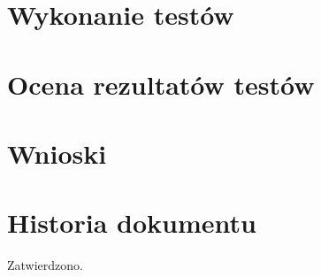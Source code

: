 \documentclass[10pt]{dokument-tiwo}
\begin{document}
\section{Wykonanie testów}


\section{Ocena rezultatów testów}


\section{Wnioski}


\newpage
\section*{Historia dokumentu}
\begin{versions}
        Zatwierdzono.
\end{versions}
\end{document}
